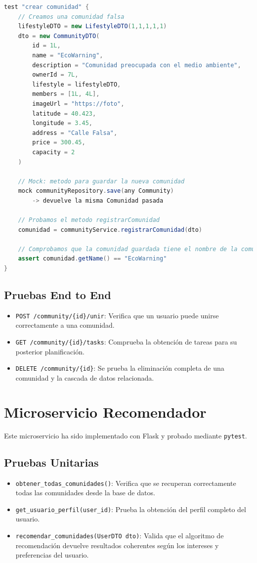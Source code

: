 \begin{lstlisting}[language=Java, caption={Pseudocódigo del test crearComunidad}]
test "crear comunidad" {
    // Creamos una comunidad falsa
    lifestyleDTO = new LifestyleDTO(1,1,1,1,1)
    dto = new CommunityDTO(
        id = 1L,
        name = "EcoWarning",
        description = "Comunidad preocupada con el medio ambiente",
        ownerId = 7L,
        lifestyle = lifestyleDTO,
        members = [1L, 4L],
        imageUrl = "https://foto",
        latitude = 40.423,
        longitude = 3.45,
        address = "Calle Falsa",
        price = 300.45,
        capacity = 2
    )

    // Mock: metodo para guardar la nueva comunidad 
    mock communityRepository.save(any Community)
        -> devuelve la misma Comunidad pasada

    // Probamos el metodo registrarComunidad
    comunidad = communityService.registrarComunidad(dto)

    // Comprobamos que la comunidad guardada tiene el nombre de la comunidad nueva registrada
    assert comunidad.getName() == "EcoWarning"
}
\end{lstlisting}
\subsection{Pruebas End to End}
\begin{itemize}
    \item \texttt{POST /community/\{id\}/unir}: Verifica que un usuario puede unirse correctamente a una comunidad.
    \item \texttt{GET /community/\{id\}/tasks}: Comprueba la obtención de tareas para su posterior planificación.
    \item \texttt{DELETE /community/\{id\}}: Se prueba la eliminación completa de una comunidad y la cascada de datos relacionada.
\end{itemize}

\section{Microservicio Recomendador}
Este microservicio ha sido implementado con Flask y probado mediante \texttt{pytest}.

\subsection{Pruebas Unitarias}
\begin{itemize}
    \item \texttt{obtener\_todas\_comunidades()}: Verifica que se recuperan correctamente todas las comunidades desde la base de datos.
    \item \texttt{get\_usuario\_perfil(user\_id)}: Prueba la obtención del perfil completo del usuario.
    \item \texttt{recomendar\_comunidades(UserDTO dto)}: Valida que el algoritmo de recomendación devuelve resultados coherentes según los intereses y preferencias del usuario.
\end{itemize}

